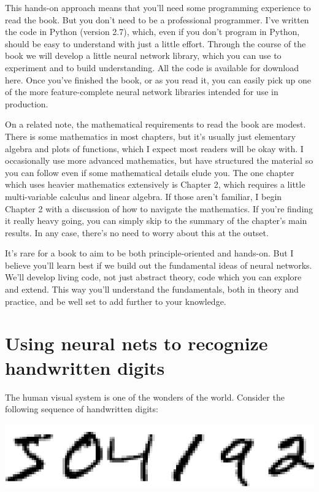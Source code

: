 \documentclass[a4paper,12pt]{report}%
\begin{document}
This hands-on approach means that you'll need some programming experience to read the book. But you don't need to be a professional programmer. I've written the code in Python (version 2.7), which, even if you don't program in Python, should be easy to understand with just a little effort. Through the course of the book we will develop a little neural network library, which you can use to experiment and to build understanding. All the code is available for download here. Once you've finished the book, or as you read it, you can easily pick up one of the more feature-complete neural network libraries intended for use in production.

On a related note, the mathematical requirements to read the book are modest. There is some mathematics in most chapters, but it's usually just elementary algebra and plots of functions, which I expect most readers will be okay with. I occasionally use more advanced mathematics, but have structured the material so you can follow even if some mathematical details elude you. The one chapter which uses heavier mathematics extensively is Chapter 2, which requires a little multi-variable calculus and linear algebra. If those aren't familiar, I begin Chapter 2 with a discussion of how to navigate the mathematics. If you're finding it really heavy going, you can simply skip to the summary of the chapter's main results. In any case, there's no need to worry about this at the outset.

It's rare for a book to aim to be both principle-oriented and hands-on. But I believe you'll learn best if we build out the fundamental ideas of neural networks. We'll develop living code, not just abstract theory, code which you can explore and extend. This way you'll understand the fundamentals, both in theory and practice, and be well set to add further to your knowledge.




\chapter{\color{IAF} \bf Using neural nets to recognize handwritten digits}
The human visual system is one of the wonders of the world. Consider the following sequence of handwritten digits:

\begin{center}
 \includegraphics[width=0.7\linewidth]{images/digits.png}
\end{center}
\end{document}
